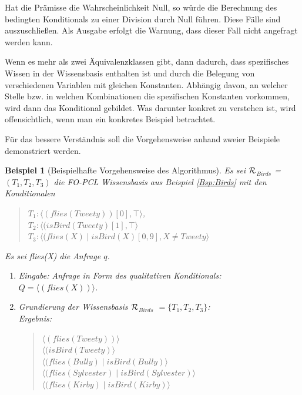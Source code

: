 \documentclass[draft]{scrreprt}
\newtheorem{Bsp}{Beispiel}[section]
\begin{document}
{Hat die Prämisse die Wahrscheinlichkeit Null, so würde die Berechnung des bedingten Konditionals zu einer Division durch Null führen. Diese Fälle sind auszuschließen. Als Ausgabe erfolgt die Warnung, dass dieser Fall nicht angefragt werden kann.

Wenn es mehr als zwei Äquivalenzklassen gibt, dann dadurch, dass spezifisches Wissen in der Wissensbasis enthalten ist und durch die Belegung von verschiedenen Variablen mit gleichen Konstanten. Abhängig davon, an welcher Stelle bzw. in welchen Kombinationen die spezifischen Konstanten vorkommen, wird dann das Konditional gebildet. Was darunter konkret zu verstehen ist, wird offensichtlich, wenn man ein konkretes Beispiel betrachtet.


Für das bessere Verständnis soll die Vorgehensweise anhand zweier Beispiele demonstriert werden. 
\begin{Bsp}[Beispielhafte Vorgehensweise des Algorithmus]
	
	Es sei  $ \cal{R} $$_{Birds}  $ = $ (T_1, T_2, T_3)  $ die FO-PCL Wissensbasis aus Beispiel \ref{Bsp:Birds} mit den Konditionalen 
	\begin{quote}
		$ T_{1}  :  \langle (flies(Tweety))[0], \top \rangle $,\\
		$ T_{2} : \langle (isBird(Tweety) [1], \top \rangle$\\
		$ T_{3} : \langle (flies(X) \mid isBird(X)[0,9], X \neq Tweety \rangle$\\
	\end{quote}
	Es sei flies(X) die Anfrage $ q $.
	
	\begin{enumerate}
		\item Eingabe: Anfrage in Form des qualitativen Konditionals:\\
		$ Q = \langle (flies(X)) \rangle $.
		\item Grundierung der Wissensbasis $ \cal  R$$_{Birds}  $ $ = \{T_1, T_2, T_3\} $:\\
		Ergebnis:
		\begin{quote}
			$\langle (flies(Tweety))\rangle $\\
			$ \langle (isBird(Tweety) \rangle$ \\
			$  \langle (flies(Bully) \mid isBird(Bully) \rangle$ \\ 
			$\langle (flies(Sylvester) \mid isBird(Sylvester) \rangle$\\
			$ \langle (flies(Kirby) \mid isBird(Kirby) \rangle $\\
		\end{quote}
		

\end{enumerate}
\end{Bsp}}
\end{document}
